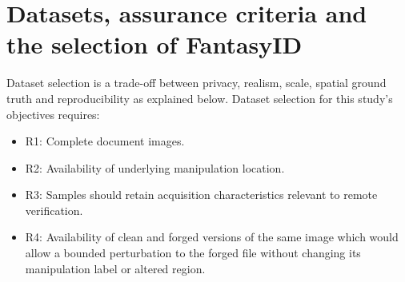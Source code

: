 



\section{Datasets, assurance criteria and the selection of FantasyID}
\label{sec:lr-data}

Dataset selection is a trade-off between privacy, realism, scale, spatial ground truth and reproducibility as explained below. Dataset selection for this study's objectives requires:
\begin{itemize}[itemsep=1pt]
    \item R1: Complete document images.
    \item R2: Availability of underlying manipulation location.
    \item R3: Samples should retain acquisition characteristics relevant to remote verification.
    \item R4: Availability of clean and forged versions of the same image which would allow a bounded perturbation to the forged file without changing its manipulation label or altered region.
\end{itemize}

